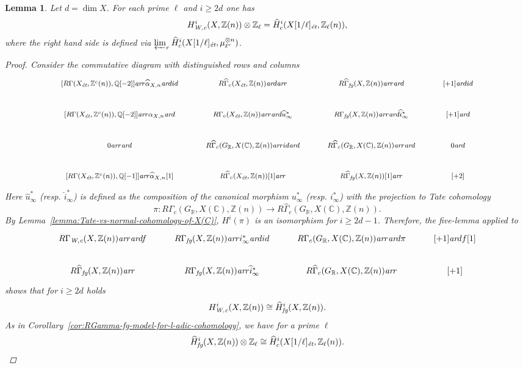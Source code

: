 \documentclass[leqno,12pt]{article}
\theoremstyle{plain}
\newtheorem{lemma}[theorem]{\indent\sc Lemma}
\theoremstyle{definition}
\newcommand{\CC}{\mathbb{C}}
\newcommand{\QQ}{\mathbb{Q}}
\newcommand{\RR}{\mathbb{R}}
\newcommand{\ZZ}{\mathbb{Z}}
\newcommand{\Wc}{\text{\it W,c}}
\newcommand{\ar}{\text{\it ar}}
\newcommand{\et}{\text{\it \'{e}t}}
\newcommand{\fg}{\text{\it fg}}
\begin{document}
\begin{lemma}
  Let $d = \dim X$. For each prime $\ell$ and $i \ge 2d$ one has
  \begin{equation}
    \label{eqn:l-adic-completion-of-H-Wc}
    H^i_\Wc (X, \ZZ (n)) \otimes \ZZ_\ell =
    \widehat{H}_c^i (X [1/\ell]_\et, \ZZ_\ell (n)),
  \end{equation}
  where the right hand side is defined via
  $\varprojlim_r \widehat{H}_c^i (X [1/\ell]_\et, \mu_{\ell^r}^{\otimes n})$.

  \begin{proof}
    Consider the commutative diagram with distinguished rows and columns
    \[ \begin{tikzcd}[font=\footnotesize]
        {[R\Gamma (X_\et, \ZZ^c(n)), \QQ[-2]]} \ar{r}{\widehat{\alpha}_{X,n}} \ar{d}{id} & R\widehat{\Gamma}_c (X_\et, \ZZ(n)) \ar{d} \ar{r} & R\widehat{\Gamma}_\fg (X, \ZZ(n)) \ar{r}\ar{d} & {[+1]} \ar{d}{id} \\
        {[R\Gamma (X_\et, \ZZ^c(n)), \QQ[-2]]} \ar{r}{\alpha_{X,n}} \ar{d} & R\Gamma_c (X_\et, \ZZ(n)) \ar{r} \ar{d}{\widehat{u}^*_\infty} & R\Gamma_\fg (X, \ZZ(n)) \ar{r} \ar{d}{\widehat{i}^*_\infty} & {[+1]} \ar{d} \\
        0 \ar{r}\ar{d} & R\widehat{\Gamma}_c (G_\RR, X(\CC), \ZZ(n)) \ar{r}{id} \ar{d} & R\widehat{\Gamma}_c (G_\RR, X(\CC), \ZZ(n)) \ar{r} \ar{d} & 0 \ar{d} \\
        {[R\Gamma (X_\et, \ZZ^c(n)), \QQ[-1]]} \ar{r}{\widehat{\alpha}_{X,n} [1]} & R\widehat{\Gamma}_c (X_\et, \ZZ(n)) [1] \ar{r} & R\widehat{\Gamma}_\fg (X, \ZZ(n)) [1] \ar{r} & {[+2]}
      \end{tikzcd} \]
    Here $\widehat{u}^*_\infty$ (resp. $\widehat{i}^*_\infty$) is defined as the
    composition of the canonical morphism $u^*_\infty$ (resp. $i^*_\infty$) with
    the projection to Tate cohomology
    \[ \pi\colon R\Gamma_c (G_\RR, X(\CC), \ZZ(n)) \to
      R\widehat{\Gamma}_c (G_\RR, X(\CC), \ZZ(n)). \]
    By Lemma~\ref{lemma:Tate-vs-normal-cohomology-of-X(C)}, $H^i (\pi)$ is an
    isomorphism for $i \ge 2d-1$. Therefore, the five-lemma applied to
    \[ \begin{tikzcd}
        R\Gamma_\Wc (X, \ZZ(n)) \ar{r}\ar{d}{f} & R\Gamma_\fg (X, \ZZ(n)) \ar{r}{i^*_\infty}\ar{d}{id} & R\Gamma_c (G_\RR, X(\CC), \ZZ(n)) \ar{r}\ar{d}{\pi} & {[+1]}\ar{d}{f [1]} \\
        R\widehat{\Gamma}_\fg (X, \ZZ(n)) \ar{r} & R\Gamma_\fg (X, \ZZ(n)) \ar{r}{\widehat{i}^*_\infty} & R\widehat{\Gamma}_c (G_\RR, X(\CC), \ZZ(n)) \ar{r} & {[+1]}
      \end{tikzcd} \]
    shows that for $i \ge 2d$ holds
    \[ H^i_\Wc (X, \ZZ(n)) \cong \widehat{H}^i_\fg (X, \ZZ(n)). \]
    As in Corollary~\ref{cor:RGamma-fg-model-for-l-adic-cohomology}, we have for a
    prime $\ell$
    \[ \widehat{H}^i_\fg (X, \ZZ(n)) \otimes \ZZ_\ell \cong \widehat{H}^i_c (X[1/\ell]_\et, \ZZ_\ell (n)). \qedhere \]
  \end{proof}
\end{lemma}
\end{document}

